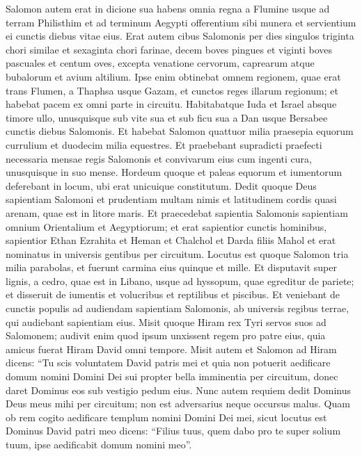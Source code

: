 \begin{biblechapter}  
\verse Salomon autem erat in dicione sua habens omnia regna a Flumine usque ad terram Philisthim et ad terminum Aegypti offerentium sibi munera et servientium ei cunctis diebus vitae eius. 
\verse Erat autem cibus Salomonis per dies singulos triginta chori similae et sexaginta chori farinae, 
\verse decem boves pingues et viginti boves pascuales et centum oves, excepta venatione cervorum, caprearum atque bubalorum et avium altilium. 
\verse Ipse enim obtinebat omnem regionem, quae erat trans Flumen, a Thaphsa usque Gazam, et cunctos reges illarum regionum; et habebat pacem ex omni parte in circuitu. 
\verse Habitabatque Iuda et Israel absque timore ullo, unusquisque sub vite sua et sub ficu sua a Dan usque Bersabee cunctis diebus Salomonis. 
\verse Et habebat Salomon quattuor milia praesepia equorum currulium et duodecim milia equestres. 
\verse Et praebebant supradicti praefecti necessaria mensae regis Salomonis et convivarum eius cum ingenti cura, unusquisque in suo mense. 
\verse Hordeum quoque et paleas equorum et iumentorum deferebant in locum, ubi erat unicuique constitutum. 
\verse Dedit quoque Deus sapientiam Salomoni et prudentiam multam nimis et latitudinem cordis quasi arenam, quae est in litore maris. 
\verse Et praecedebat sapientia Salomonis sapientiam omnium Orientalium et Aegyptiorum; 
\verse et erat sapientior cunctis hominibus, sapientior Ethan Ezrahita et Heman et Chalchol et Darda filiis Mahol et erat nominatus in universis gentibus per circuitum. 
\verse Locutus est quoque Salomon tria milia parabolas, et fuerunt carmina eius quinque et mille. 
\verse Et disputavit super lignis, a cedro, quae est in Libano, usque ad hyssopum, quae egreditur de pariete; et disseruit de iumentis et volucribus et reptilibus et piscibus. 
\verse Et veniebant de cunctis populis ad audiendam sapientiam Salomonis, ab universis regibus terrae, qui audiebant sapientiam eius. 
\verse Misit quoque Hiram rex Tyri servos suos ad Salomonem; audivit enim quod ipsum unxissent regem pro patre eius, quia amicus fuerat Hiram David omni tempore.  
\verse Misit autem et Salomon ad Hiram dicens: 
\verse “Tu scis voluntatem David patris mei et quia non potuerit aedificare domum nomini Domini Dei sui propter bella imminentia per circuitum, donec daret Dominus eos sub vestigio pedum eius.  
\verse Nunc autem requiem dedit Dominus Deus meus mihi per circuitum; non est adversarius neque occursus malus. 
\verse Quam ob rem cogito aedificare templum nomini Domini Dei mei, sicut locutus est Dominus David patri meo dicens: “Filius tuus, quem dabo pro te super solium tuum, ipse aedificabit domum nomini meo”. 

\end{biblechapter}
